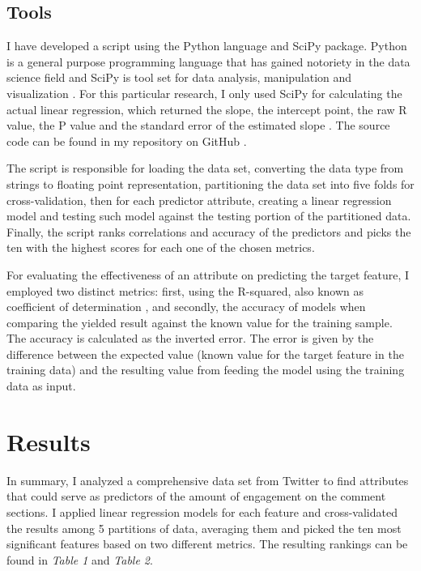 \documentclass[11pt]{article}
\begin{document}
\subsection {Tools}
\label{tools}
I have developed a script using the Python language and SciPy package. Python is a general purpose programming language \cite{van1995python} \cite{programming} that has gained notoriety in the data science field \cite{kdnuggets} \cite{results} and SciPy is tool set for data analysis, manipulation and visualization \cite{blanco2013learning}. For this particular research, I only used SciPy for calculating the actual linear regression, which returned the slope, the intercept point, the raw R value, the P value and the standard error of the estimated slope \cite{guide}. The source code can be found in my repository on GitHub \cite{thiagorcdlsocial_media_buzz}.

The script is responsible for loading the data set, converting the data type from strings to floating point representation, partitioning the data set into five folds for cross-validation, then for each predictor attribute, creating a linear regression model and testing such model against the testing portion of the partitioned data. Finally, the script ranks correlations and accuracy of the predictors and picks the ten with the highest scores for each one of the chosen metrics.

For evaluating the effectiveness of an attribute on predicting the target feature, I employed two distinct metrics: first, using the R-squared, also known as coefficient of determination \cite{zhang2017coefficient}, and secondly, the accuracy of models when comparing the yielded result against the known value for the training sample. The accuracy is calculated as the inverted error. The error is given by the difference between the expected value (known value for the target feature in the training data) and the resulting value from feeding the model using the training data as input.



\section {Results}
\label{results}
In summary, I analyzed a comprehensive data set from Twitter to find attributes that could serve as predictors of the amount of engagement on the comment sections. I applied linear regression models for each feature and cross-validated the results among 5 partitions of data, averaging them and picked the ten most significant features based on two different metrics. The resulting rankings can be found in \textit{Table 1} and \textit{Table 2}.
\end{document}
